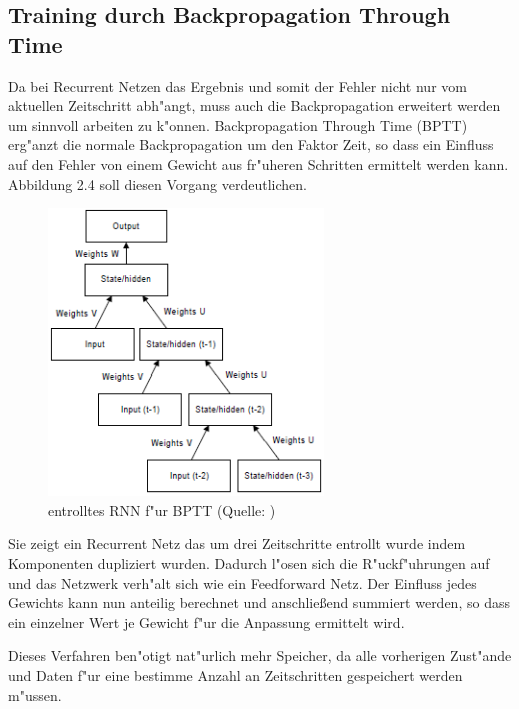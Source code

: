 {\subsection{Training durch Backpropagation Through Time}
Da bei Recurrent Netzen das Ergebnis und somit der Fehler nicht nur vom aktuellen Zeitschritt abh"angt, muss auch die Backpropagation erweitert werden um sinnvoll arbeiten zu k"onnen. Backpropagation Through Time (BPTT) erg"anzt die normale Backpropagation um den Faktor Zeit, so dass ein Einfluss auf den Fehler von einem Gewicht aus fr"uheren Schritten ermittelt werden kann. Abbildung 2.4 soll diesen Vorgang verdeutlichen. 
\renewcommand{\figurename}{Abb.}
\begin{figure}[hb]
\centering
\includegraphics[width=0.65\textwidth]{pictures/bptt_cut.png}
\caption[BPTT]{entrolltes RNN f"ur BPTT (Quelle: \cite{BPTT})}
\end{figure}
Sie zeigt ein Recurrent Netz das um drei Zeitschritte entrollt wurde indem Komponenten dupliziert wurden. Dadurch l"osen sich die R"uckf"uhrungen auf und das Netzwerk verh"alt sich wie ein Feedforward Netz. Der Einfluss jedes Gewichts kann nun anteilig berechnet und anschlie{\ss}end summiert werden, so dass ein einzelner Wert je Gewicht f"ur die Anpassung ermittelt wird.

Dieses Verfahren ben"otigt nat"urlich mehr Speicher, da alle vorherigen Zust"ande und Daten f"ur eine bestimme Anzahl an Zeitschritten gespeichert werden m"ussen.


}
